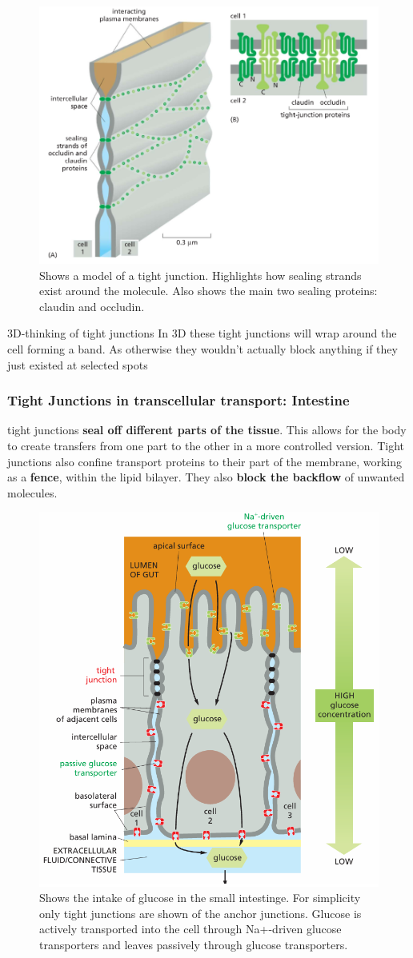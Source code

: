 \documentclass[../main.tex]{subfiles}
\begin{document}
\begin{figure}[H]
	\centering
	\includegraphics[width=0.6\linewidth]{tight_over}
	\caption{Shows a model of a tight junction. Highlights how sealing strands exist around the molecule. Also shows the main two sealing proteins: claudin and occludin.}
	\label{fig:tightover}
\end{figure}


\begin{RemarkWithTitel}{3D-thinking of tight junctions}
	In 3D these tight junctions will wrap around the cell forming a band. As otherwise they wouldn't actually block anything if they just existed at selected spots
\end{RemarkWithTitel}

\subsubsection{Tight Junctions in transcellular transport: Intestine}

tight junctions \textbf{seal off different parts of the tissue}. This allows for the body to create transfers from one part to the other in a more controlled version. Tight junctions also confine transport proteins to their part of the membrane, working as a \textbf{fence}, within the lipid bilayer. They also \textbf{block the backflow} of unwanted molecules.

\begin{figure}[H]
	\centering
	\includegraphics[width=0.6\linewidth]{tight_glu}
	\caption{Shows the intake of glucose in the small intestinge. For simplicity only tight junctions are shown of the anchor junctions. Glucose is actively transported into the cell through Na+-driven glucose transporters and leaves passively through glucose transporters.}
	\label{fig:tightglu}
\end{figure}
\end{document}
